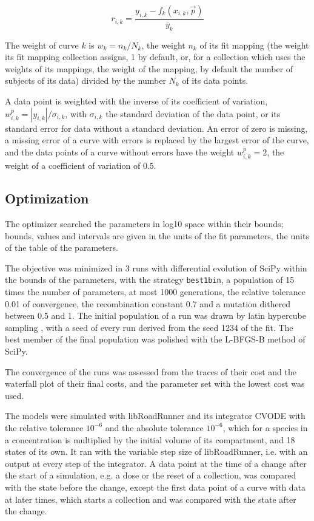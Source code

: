 \documentclass{article}
\begin{document}
\begin{equation}
r_{i,k} = \frac{y_{i,k} - f_k(x_{i,k}, \vec{p})}{\overline{y}_k}
\end{equation}

The weight of curve $k$ is $w_k = n_k / N_k$, the weight $n_k$ of its fit mapping (the weight its fit mapping collection assigns, 1 by default, or, for a collection which uses the weights of its mappings, the weight of the mapping, by default the number of subjects of its data) divided by the number $N_k$ of its data points.

A data point is weighted with the inverse of its coefficient of variation, $w^{p}_{i,k} = |y_{i,k}| / \sigma_{i,k}$, with $\sigma_{i,k}$ the standard deviation of the data point, or its standard error for data without a standard deviation. An error of zero is missing, a missing error of a curve with errors is replaced by the largest error of the curve, and the data points of a curve without errors have the weight $w^{p}_{i,k} = 2$, the weight of a coefficient of variation of 0.5.

\subsection{Optimization}

The optimizer searched the parameters in log10 space within their bounds; bounds, values and intervals are given in the units of the fit parameters, the units of the table of the parameters.

The objective was minimized in 3 runs with differential evolution \cite{Storn1997} of SciPy \cite{Virtanen2020} within the bounds of the parameters, with the strategy \texttt{best1bin}, a population of 15 times the number of parameters, at most 1000 generations, the relative tolerance 0.01 of convergence, the recombination constant 0.7 and a mutation dithered between 0.5 and 1. The initial population of a run was drawn by latin hypercube sampling \cite{McKay1979}, with a seed of every run derived from the seed 1234 of the fit. The best member of the final population was polished with the L-BFGS-B method of SciPy.

The convergence of the runs was assessed from the traces of their cost and the waterfall plot of their final costs, and the parameter set with the lowest cost was used.

The models were simulated with libRoadRunner \cite{Welsh2023} and its integrator CVODE \cite{Hindmarsh2005} with the relative tolerance $10^{-6}$ and the absolute tolerance $10^{-6}$, which for a species in a concentration is multiplied by the initial volume of its compartment, and 18 states of its own. It ran with the variable step size of libRoadRunner, i.e. with an output at every step of the integrator. A data point at the time of a change after the start of a simulation, e.g. a dose or the reset of a collection, was compared with the state before the change, except the first data point of a curve with data at later times, which starts a collection and was compared with the state after the change.
\end{document}
